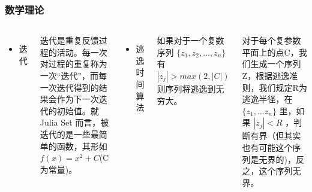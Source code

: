 \documentclass{beamer}
\begin{document}
\begin{frame}
  \frametitle{数学理论}
  \begin{columns}
    \begin{itemize}
    \item 迭代
    \end{itemize}
    迭代是重复反馈过程的活动。每一次对过程的重复称为一次“迭代”，而每一次迭代得到的结果会作为下一次迭代的初始值。就 Julia Set 而言，被迭代的是一些最简单的函数，其形如 $f(x) = x^2 + C$(C 为常量)。
    \begin{itemize}
    \item 逃逸时间算法
    \end{itemize}
    如果对于一个复数序列 $\{z_1, z_2, \dots, z_n\}$ 有 $|z_j| > max(2,|C|)$ 则序列将逃逸到无穷大。

    对于每个复参数平面上的点C，我们生成一个序列Z，根据逃逸准则，我们规定R为逃逸半径，在 $\{z_1, \dots z_n\}$ 里，如果 $|z_j| < R$ ，判断有界（但其实也有可能这个序列是无界的)，反之，这个序列无界。
  \end{columns}
\end{frame}
\end{document}

